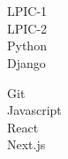 \documentclass[9pt]{developercv}
\begin{document}
\\\\
\begin{minipage}[t]{0.49\textwidth}
	\huge
	\vspace{-\baselineskip}

	\faCircle \; {LPIC-1}\\
	\faCircle \; {LPIC-2}\\
	\faCircle \; {Python}\\
	\faCircle \; {Django}\\
\end{minipage}
\begin{minipage}[t]{0.50\textwidth}
	\huge
	\vspace{-\baselineskip}

	\faCircle \; {Git}\\
	\faCircle \; {Javascript}\\
	\faCircle \; {React}\\
	\faCircle \; {Next.js}\\
\end{minipage}

\hfill
\end{document}
